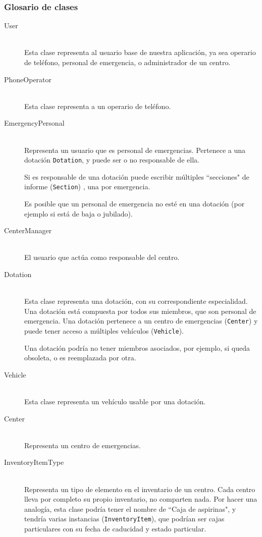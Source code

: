\subsubsection{Glosario de clases}
\begin{description}
    \item[User] \hfill \\
        Esta clase representa al usuario base de nuestra aplicación, ya sea operario de teléfono, personal de emergencia, o administrador de un centro.
    \item[PhoneOperator] \hfill \\
        Esta clase representa a un operario de teléfono.
    \item[EmergencyPersonal] \hfill \\
        Representa un usuario que es personal de emergencias. Pertenece a una dotación \texttt{Dotation}, y puede ser o no responsable de ella. \par
        Si es responsable de una dotación puede escribir múltiples ``secciones" de informe (\texttt{Section}) , una por emergencia. \par
        Es posible que un personal de emergencia no esté en una dotación (por ejemplo si está de baja o jubilado).
    \item[CenterManager] \hfill \\
        El usuario que actúa como responsable del centro.
    \item[Dotation] \hfill \\
        Esta clase representa una dotación, con su correspondiente especialidad. Una dotación está compuesta por todos sus miembros, que son personal de emergencia. Una dotación pertenece a un centro de emergencias (\texttt{Center}) y puede tener acceso a múltiples vehículos (\texttt{Vehicle}). \par
        Una dotación podría no tener miembros asociados, por ejemplo, si queda obsoleta, o es reemplazada por otra.
    \item[Vehicle] \hfill \\
        Esta clase representa un vehículo usable por una dotación.
    \item[Center] \hfill \\
        Representa un centro de emergencias.
    \item[InventoryItemType] \hfill \\
        Representa un tipo de elemento en el inventario de un centro. Cada centro lleva por completo su propio inventario, no comparten nada. Por hacer una analogía, esta clase podría tener el nombre de ``Caja de aspirinas", y tendría varias instancias (\texttt{InventoryItem}), que podrían ser cajas particulares con su fecha de caducidad y estado particular. \par

\end{description}
